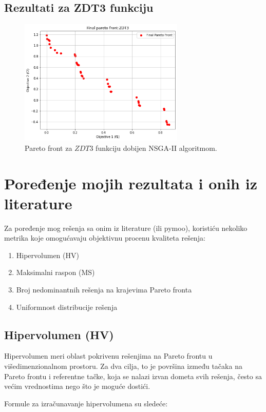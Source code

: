 \documentclass[12pt]{article}
\begin{document}
\subsection{Rezultati za ZDT3 funkciju}
\begin{figure}[H]
    \centering
    \includegraphics[width=0.7\textwidth]{images/zdt3.png}
    \caption{Pareto front za \( ZDT3 \) funkciju dobijen NSGA-II algoritmom.}
    \label{fig:zdt3_results}
\end{figure}

\section{Poređenje mojih rezultata i onih iz literature}
Za poređenje mog rešenja sa onim iz literature (ili pymoo), koristiću nekoliko metrika koje omogućavaju objektivnu procenu kvaliteta rešenja:
\cite{gete-plots}
\begin{enumerate} 
	\item {Hipervolumen (HV)} 
	\item {Maksimalni raspon (MS)} 
	\item {Broj nedominantnih rešenja na krajevima Pareto fronta} 
	\item {Uniformnost distribucije rešenja} 
\end{enumerate}

\subsection{Hipervolumen (HV)}
Hipervolumen meri oblast pokrivenu rešenjima na Pareto frontu u višedimenzionalnom prostoru. Za dva cilja, to je površina između tačaka na Pareto frontu i referentne tačke, koja se nalazi izvan dometa svih rešenja, često sa većim vrednostima nego što je moguće dostići.
   
Formule za izračunavanje hipervolumena su sledeće:
\end{document}
